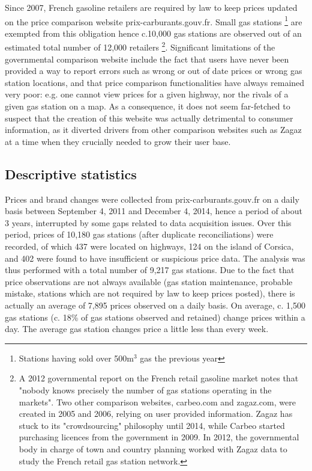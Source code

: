 \documentclass[english]{article}
\begin{document}
Since 2007, French gasoline retailers are required by law to keep prices updated on the price comparison website prix-carburants.gouv.fr. Small gas stations%
\footnote{Stations having sold over 500m$^{3}$ gas the previous year%
} are exempted from this obligation hence c.10,000 gas stations are observed out of an estimated total number of 12,000 retailers%
\footnote{A 2012 governmental report on the French retail gasoline market notes that "nobody knows precisely the number of gas stations operating in the markets". Two other comparison websites, carbeo.com and zagaz.com, were created in 2005 and 2006, relying on user provided information. Zagaz has stuck to its "crowdsourcing" philosophy until 2014, while Carbeo started purchasing licences from the government in 2009. In 2012, the governmental body in charge of town and country planning worked with Zagaz data to study the French retail gas station network.%
}.
Significant limitations of the governmental comparison website include the fact that users have never been provided a way to report errors such as wrong or out of date prices or wrong gas station locations, and that price comparison functionalities have always remained very poor: e.g. one cannot view prices for a given highway, nor the rivals of a given gas station on a map. As a consequence, it does not seem far-fetched to suspect that the creation of this website was actually detrimental to consumer information, as it diverted drivers from other comparison websites such as Zagaz at a time when they crucially needed to grow their user base.

\subsection{Descriptive statistics}

Prices and brand changes were collected from prix-carburants.gouv.fr on a daily basis between September 4, 2011 and December 4, 2014, hence a period of about 3 years, interrupted by some gaps related to data acquisition issues. Over this period, prices of 10,180 gas stations (after duplicate reconciliations) were recorded, of which 437 were located on highways, 124 on the island of Corsica, and 402 were found to have insufficient or suspicious price data. The analysis was thus performed with a total number of 9,217 gas stations. Due to the fact that price observations are not always available (gas station maintenance, probable mistake, stations which are not required by law to keep prices posted), there is actually an average of 7,895 prices observed on a daily basis. On average, c. 1,500 gas stations (c. 18\% of gas stations observed and retained) change prices within a day. The average gas station changes price a little less than every week.
\end{document}
